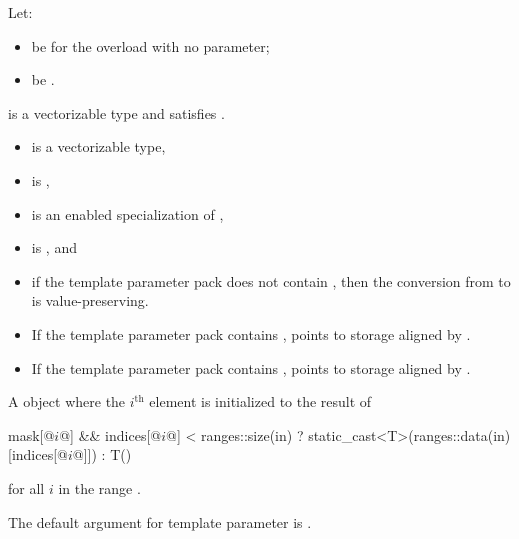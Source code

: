 \begin{itemdescr}
\pnum
Let:
\begin{itemize}
 \item
   be  for the overload with no
   parameter;
 \item
   be .
\end{itemize}

\pnum
\constraints
{} is a vectorizable type and satisfies
.

\pnum
\mandates
\begin{itemize}
\item
{} is a vectorizable type,
\item
{} is ,
\item
{} is an enabled specialization of ,
\item
{} is , and
\item
if the template parameter pack  does not contain
, then the conversion from
 to  is value-preserving.
\end{itemize}

\pnum
\expects
\begin{itemize}
\item
If the template parameter pack  contains
,  points to storage aligned by
.
\item
If the template parameter pack  contains
,  points to
storage aligned by .
\end{itemize}

\pnum
\returns
A  object where the $i^\text{th}$
element is initialized to the result of
\begin{codeblock}
mask[@$i$@] && indices[@$i$@] < ranges::size(in) ? static_cast<T>(ranges::data(in)[indices[@$i$@]]) : T()
\end{codeblock}
for all $i$ in the range .

\pnum
\remarks
The default argument for template parameter  is
.
\end{itemdescr}

